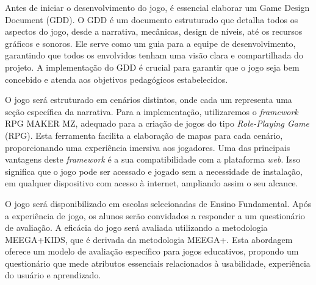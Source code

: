 Antes de iniciar o desenvolvimento do jogo, é essencial elaborar um Game Design Document (GDD). O GDD é um documento estruturado que detalha todos os aspectos do jogo, desde a narrativa, mecânicas, design de níveis, até os recursos gráficos e sonoros. Ele serve como um guia para a equipe de desenvolvimento, garantindo que todos os envolvidos tenham uma visão clara e compartilhada do projeto. A implementação do GDD é crucial para garantir que o jogo seja bem concebido e atenda aos objetivos pedagógicos estabelecidos\cite{arifudin2022gdd}.

O jogo será estruturado em cenários distintos, onde cada um representa uma seção específica da narrativa. Para a implementação, utilizaremos o \textit{framework} RPG MAKER MZ, adequado para a criação de jogos do tipo \textit{Role-Playing Game} (RPG). Esta ferramenta facilita a elaboração de mapas para cada cenário, proporcionando uma experiência imersiva aos jogadores. Uma das principais vantagens deste \textit{framework} é a sua compatibilidade com a plataforma \textit{web}. Isso significa que o jogo pode ser acessado e jogado sem a necessidade de instalação, em qualquer dispositivo com acesso à internet, ampliando assim o seu alcance.

O jogo será disponibilizado em escolas selecionadas de Ensino Fundamental. Após a experiência de jogo, os alunos serão convidados a responder a um questionário de avaliação. A eficácia do jogo será avaliada utilizando a metodologia MEEGA+KIDS\cite{GresseVonWangenheim2020}, que é derivada da metodologia MEEGA+\cite{petri2019meega+}. Esta abordagem oferece um modelo de avaliação específico para jogos educativos, propondo um questionário que mede atributos essenciais relacionados à usabilidade, experiência do usuário e aprendizado.